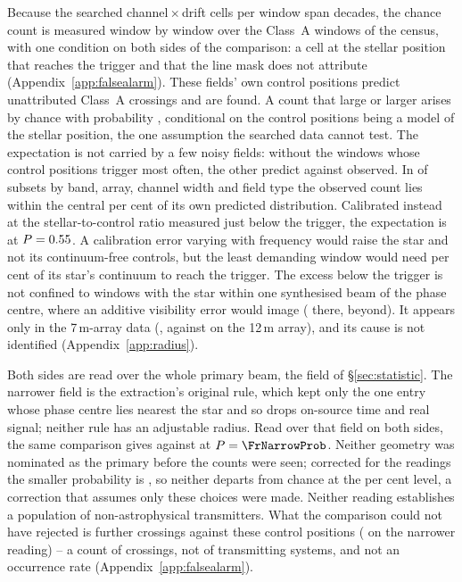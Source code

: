 Because the searched channel\,$\times$\,drift cells per window span
\TuCellsDecades{} decades, the chance count is measured window by window over
the \CeNWin{} Class~A windows of the census, with one condition on both sides of
the comparison: a cell at the stellar position that reaches the trigger and
that the line mask does not attribute (Appendix~\ref{app:falsealarm}). These
fields' own control positions predict \CeExp{} unattributed Class~A crossings
and \CeObs{} are found. A count that large or larger arises by chance with
probability \CeProbNull{}, conditional on the control positions being a model
of the stellar position, the one assumption the searched data cannot test.
The expectation is not carried by a few noisy fields: without the
\BgTopNWord{} windows whose control positions trigger most often, the other
\BgDropTenNWin{} predict \BgDropTenExp{} against \BgDropTenObs{} observed. In \BgNConfIn{} of \BgNConf{} subsets by band, array, channel width and field
type the observed count lies within the central \CeCovPct{} per cent of its own
predicted distribution. Calibrated instead at the stellar-to-control ratio
\CeNear{} measured just below the trigger, the expectation is \CeExpNear{} at
$P=0.55$. A calibration error varying with frequency would raise the
star and not its continuum-free controls, but the least demanding window would
need \CyEpsMinPct{} per cent of its star's continuum to reach the trigger. The
excess below the trigger is not confined to windows with
the star within one synthesised beam of the phase centre, where an additive
visibility error would image (\BgPcOnRatio{} there, \BgPcOffRatio{} beyond). It appears only in the
7\,m-array data (\BgArrSevenRatio, against \BgArrTwelveRatio{} on the 12\,m
array), and its cause is not identified
(Appendix~\ref{app:radius}).

Both sides are read over the whole primary beam, the field of
\S\ref{sec:statistic}. The narrower field is the
extraction's original rule, which kept only the one entry whose phase centre
lies nearest the star and so drops on-source time and real signal; neither
rule has an adjustable radius. Read over that field on both sides, the same
comparison gives \FrNarrowObs{} against \FrNarrowExp{} at $P=\FrNarrowProb$.
Neither geometry was nominated as the primary before the counts were seen;
corrected for the \FrNRead{} readings the smaller probability is
\FrTwoTrialP, so neither departs from chance at the \CeAlphaPct{} per cent
level, a correction that assumes only these \FrNRead{} choices were made.
Neither reading establishes a population of non-astrophysical transmitters.
What the comparison could not have rejected is \CeAddLim{} further crossings
against these control positions (\FrNarrowAddLim{} on the narrower reading)
-- a count of
crossings, not of transmitting systems, and not an occurrence rate
(Appendix~\ref{app:falsealarm}).


